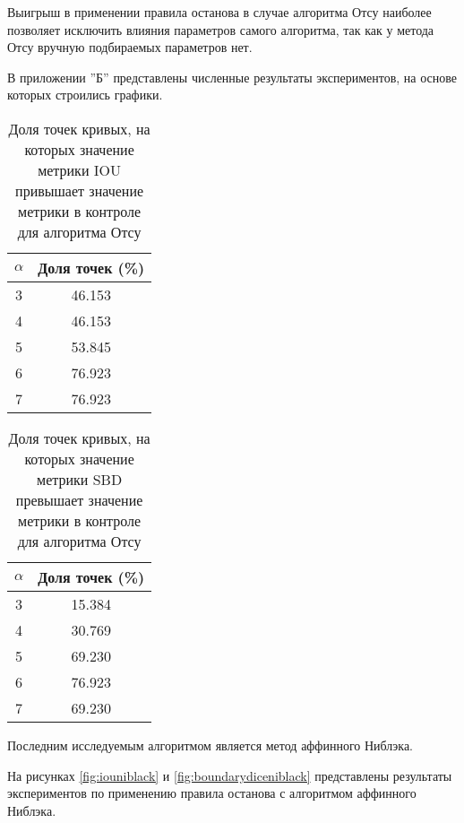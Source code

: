 Выигрыш в применении правила останова в случае алгоритма Отсу наиболее позволяет исключить влияния параметров самого алгоритма, так как у метода Отсу вручную подбираемых параметров нет.

В приложении ''Б'' представлены численные результаты экспериментов, на основе которых строились графики.

 


\begin{table}[H]
\centering
\caption{Доля точек кривых, на которых значение метрики IOU привышает значение метрики в  контроле для алгоритма Отсу}
\label{tab:otsuiou}
\begin{tabular}{|c|c|}
\hline
\(\alpha\) & Доля точек (\%) \\
\hline
3 & 46.153 \\
4 & 46.153 \\
5 & 53.845 \\
6 & 76.923 \\
7 & 76.923 \\
\hline
\end{tabular}
\end{table}

\begin{table}[H]
\centering
\caption{Доля точек кривых, на которых значение метрики SBD превышает значение метрики в  контроле для алгоритма Отсу}
\label{tab:otsusbd}
\begin{tabular}{|c|c|}
\hline
\(\alpha\) & Доля точек (\%) \\
\hline
3 & 15.384 \\
4 & 30.769 \\
5 & 69.230 \\
6 & 76.923 \\
7 & 69.230 \\
\hline
\end{tabular}
\end{table}

Последним исследуемым алгоритмом является метод аффинного Ниблэка.

На рисунках \ref*{fig:iouniblack} и \ref*{fig:boundarydiceniblack} представлены результаты экспериментов по применению правила останова с алгоритмом аффинного Ниблэка.

